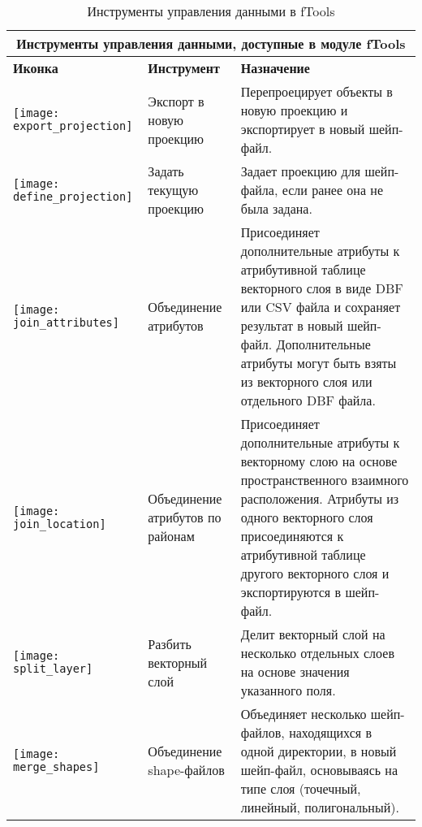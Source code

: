 \begin{table}[ht]
\centering
\begin{tabular}{|m{1cm}|m{3cm}|m{9cm}|}
 \hline \multicolumn{3}{|c|}{\textbf{Инструменты управления данными, доступные в модуле fTools}} \\
 \hline \textbf{Иконка} & \textbf{Инструмент} & \textbf{Назначение} \\
 \hline \texttt{[image: export\_projection]} & Экспорт в новую проекцию &
 Перепроецирует объекты в новую проекцию и экспортирует в новый шейп-файл. \\
 \hline \texttt{[image: define\_projection]} & Задать текущую проекцию &
 Задает проекцию для шейп-файла, если ранее она не была задана. \\
 \hline \texttt{[image: join\_attributes]} & Объединение атрибутов & Присоединяет
 дополнительные атрибуты к атрибутивной таблице векторного слоя в виде DBF или CSV файла и
 сохраняет результат в новый шейп-файл. Дополнительные атрибуты могут быть взяты из
 векторного слоя или отдельного DBF файла. \\
 \hline \texttt{[image: join\_location]} & Объединение атрибутов по районам & Присоединяет
 дополнительные атрибуты к векторному слою на основе пространственного взаимного расположения.
 Атрибуты из одного векторного слоя присоединяются к атрибутивной таблице другого векторного слоя и
 экспортируются в шейп-файл. \\
 \hline \texttt{[image: split\_layer]} & Разбить векторный слой &
 Делит векторный слой на несколько отдельных слоев на основе значения указанного поля. \\
 \hline \texttt{[image: merge\_shapes]} & Объединение shape-файлов &
 Объединяет несколько шейп-файлов, находящихся в одной директории, в новый шейп-файл,
 основываясь на типе слоя (точечный, линейный, полигональный). \\
 \hline
\end{tabular}
\caption{Инструменты управления данными в fTools}\label{tab:fTool_data_management}
\end{table}

\FloatBarrier
